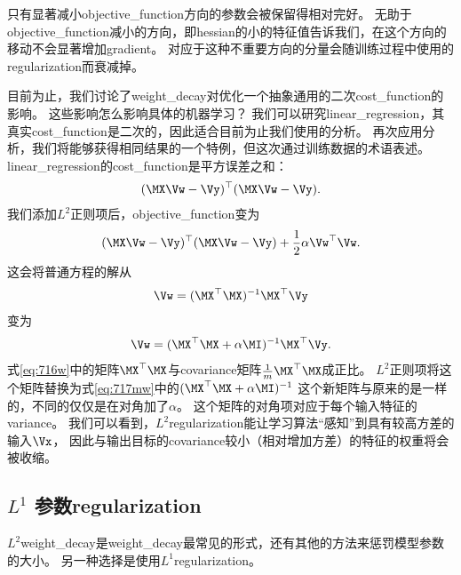 
只有显著减小\gls{objective_function}方向的参数会被保留得相对完好。
无助于\gls{objective_function}减小的方向，即\gls{hessian}的小的特征值告诉我们，在这个方向的移动不会显著增加\gls{gradient}。
对应于这种不重要方向的分量会随训练过程中使用的\gls{regularization}而衰减掉。


目前为止，我们讨论了\gls{weight_decay}对优化一个抽象通用的二次\gls{cost_function}的影响。
这些影响怎么影响具体的机器学习？
我们可以研究\gls{linear_regression}，其真实\gls{cost_function}是二次的，因此适合目前为止我们使用的分析。
再次应用分析，我们将能够获得相同结果的一个特例，但这次通过训练数据的术语表述。
\gls{linear_regression}的\gls{cost_function}是平方误差之和：
\begin{align}
 (\MX \Vw - \Vy)^\top (\MX \Vw - \Vy).
\end{align}
我们添加$L^2$正则项后，\gls{objective_function}变为
\begin{align}
  (\MX \Vw - \Vy)^\top (\MX \Vw - \Vy) + \frac{1}{2}\alpha \Vw^\top \Vw.
\end{align}
这会将普通方程的解从
\begin{align}
\label{eq:716w}
  \Vw = (\MX^\top \MX)^{-1} \MX^\top \Vy
\end{align}
变为
\begin{align}
\label{eq:717mw}
   \Vw = (\MX^\top \MX + \alpha \MI)^{-1} \MX^\top \Vy .
\end{align}
式\ref{eq:716w}中的矩阵$\MX^\top\MX$与\gls{covariance}矩阵$\frac{1}{m}\MX^\top\MX$成正比。
$L^2$正则项将这个矩阵替换为式\ref{eq:717mw}中的$ (\MX^\top \MX + \alpha \MI)^{-1}$
这个新矩阵与原来的是一样的，不同的仅仅是在对角加了$\alpha$。
这个矩阵的对角项对应于每个输入特征的\gls{variance}。
我们可以看到，$L^2$\gls{regularization}能让学习算法``感知''到具有较高方差的输入$\Vx$， 因此与输出目标的\gls{covariance}较小（相对增加方差）的特征的权重将会被收缩。

\subsection{$L^1$ 参数\gls{regularization}}
\label{sec:l1_regularization}
$L^2$\gls{weight_decay}是\gls{weight_decay}最常见的形式，还有其他的方法来惩罚模型参数的大小。
另一种选择是使用$L^1$\gls{regularization}。


